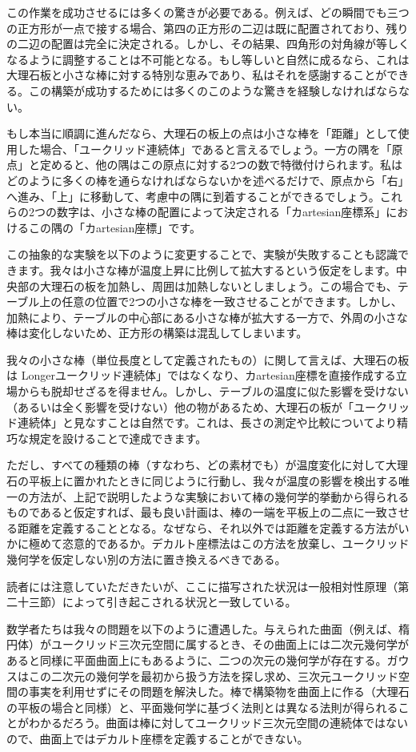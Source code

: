 \documentclass[a4paper,11pt,openany]{ltjsbook}
\begin{document}
この作業を成功させるには多くの驚きが必要である。例えば、どの瞬間でも三つの正方形が一点で接する場合、第四の正方形の二辺は既に配置されており、残りの二辺の配置は完全に決定される。しかし、その結果、四角形の対角線が等しくなるように調整することは不可能となる。もし等しいと自然に成るなら、これは大理石板と小さな棒に対する特別な恵みであり、私はそれを感謝することができる。この構築が成功するためには多くのこのような驚きを経験しなければならない。

もし本当に順調に進んだなら、大理石の板上の点は小さな棒を「距離」として使用した場合、「ユークリッド連続体」であると言えるでしょう。一方の隅を「原点」と定めると、他の隅はこの原点に対する2つの数で特徴付けられます。私はどのように多くの棒を通らなければならないかを述べるだけで、原点から「右」へ進み、「上」に移動して、考慮中の隅に到着することができるでしょう。これらの2つの数字は、小さな棒の配置によって決定される「カartesian座標系」におけるこの隅の「カartesian座標」です。

この抽象的な実験を以下のように変更することで、実験が失敗することも認識できます。我々は小さな棒が温度上昇に比例して拡大するという仮定をします。中央部の大理石の板を加熱し、周囲は加熱しないとしましょう。この場合でも、テーブル上の任意の位置で2つの小さな棒を一致させることができます。しかし、加熱により、テーブルの中心部にある小さな棒が拡大する一方で、外周の小さな棒は変化しないため、正方形の構築は混乱してしまいます。

我々の小さな棒（単位長度として定義されたもの）に関して言えば、大理石の板は Longerユークリッド連続体」ではなくなり、カartesian座標を直接作成する立場からも脱却せざるを得ません。しかし、テーブルの温度に似た影響を受けない（あるいは全く影響を受けない）他の物があるため、大理石の板が「ユークリッド連続体」と見なすことは自然です。これは、長さの測定や比較についてより精巧な規定を設けることで達成できます。

ただし、すべての種類の棒（すなわち、どの素材でも）が温度変化に対して大理石の平板上に置かれたときに同じように行動し、我々が温度の影響を検出する唯一の方法が、上記で説明したような実験において棒の幾何学的挙動から得られるものであると仮定すれば、最も良い計画は、棒の一端を平板上の二点に一致させる距離を定義することとなる。なぜなら、それ以外では距離を定義する方法がいかに極めて恣意的であるか。デカルト座標法はこの方法を放棄し、ユークリッド幾何学を仮定しない別の方法に置き換えるべきである。

読者には注意していただきたいが、ここに描写された状況は一般相対性原理（第二十三節）によって引き起こされる状況と一致している。

 数学者たちは我々の問題を以下のように遭遇した。与えられた曲面（例えば、楕円体）がユークリッド三次元空間に属するとき、その曲面上には二次元幾何学があると同様に平面曲面上にもあるように、二つの次元の幾何学が存在する。ガウスはこの二次元の幾何学を最初から扱う方法を探し求め、三次元ユークリッド空間の事実を利用せずにその問題を解決した。棒で構築物を曲面上に作る（大理石の平板の場合と同様）と、平面幾何学に基づく法則とは異なる法則が得られることがわかるだろう。曲面は棒に対してユークリッド三次元空間の連続体ではないので、曲面上ではデカルト座標を定義することができない。
\end{document}
